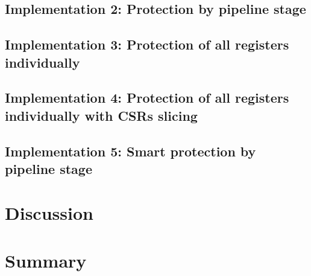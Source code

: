     \subsection{Implementation 2: Protection by pipeline stage}

    \subsection{Implementation 3: Protection of all registers individually}

    \subsection{Implementation 4: Protection of all registers individually with CSRs slicing}

    \subsection{Implementation 5: Smart protection by pipeline stage}


\section{Discussion}

\section{Summary}

